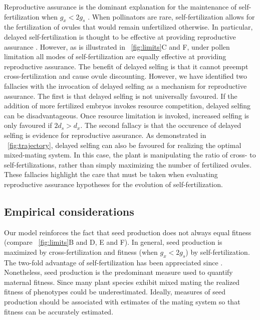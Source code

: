 \documentclass[letterpaper,titlepage]{scrartcl}
\begin{document}
Reproductive assurance is the dominant explanation for the maintenance
of self-fertilization when $g_{x}<2g_{s}$
\citep{Darwin76,Lloyd92a,Herlihy02,Kalisz04}. When pollinators are rare,
self-fertilization allows for the fertilization of ovules that would
remain unfertilized otherwise. In particular, delayed
self-fertilization is thought to be effective at providing
reproductive assurance \citep{Lloyd92a,Kalisz99}. However, as is
illustrated in {\fref}~\ref{fig:limits}C and F, under pollen
limitation all modes of self-fertilization are equally effective at
providing reproductive assurance. The benefit of delayed selfing is
that it cannot preempt cross-fertilization and cause ovule
discounting. However, we have identified two fallacies with the
invocation of delayed selfing as a mechanism for reproductive
assurance. The first is that delayed selfing is not universally
favoured. If the addition of more fertilized embryos invokes resource
competition, delayed selfing can be disadvantageous. Once resource
limitation is invoked, increased selfing is only favoured if
$2d_{s}>d_{x}$. The second fallacy is that the occurence of delayed
selfing is evidence for reproductive assurance. As demonstrated in
{\fref}~\ref{fig:trajectory}, delayed selfing can also be favoured for
realizing the optimal mixed-mating system. In this case, the plant is
manipulating the ratio of cross- to self-fertilizations, rather than
simply maximizing the number of fertilized ovules. These fallacies
highlight the care that must be taken when evaluating reproductive
assurance hypotheses for the evolution of self-fertilization.

\subsection{Empirical considerations}
Our model reinforces the fact that seed production does not always
equal fitness (compare {\fref}~\ref{fig:limits}B and D, E and F). In
general, seed production is maximized by cross-fertilization and
fitness (when $g_{x}<2g_{s}$) by self-fertilization. The two-fold
advantage of self-fertilization has been appreciated since
\citet{Fisher30}. Nonetheless, seed production is the predominant
measure used to quantify maternal fitness. Since many plant species
exhibit mixed mating \citep{Barrett90a} the realized fitness of
phenotypes could be underestimated. Ideally, measures of seed
production should be associated with estimates of the mating system so
that fitness can be accurately estimated.
\end{document}
